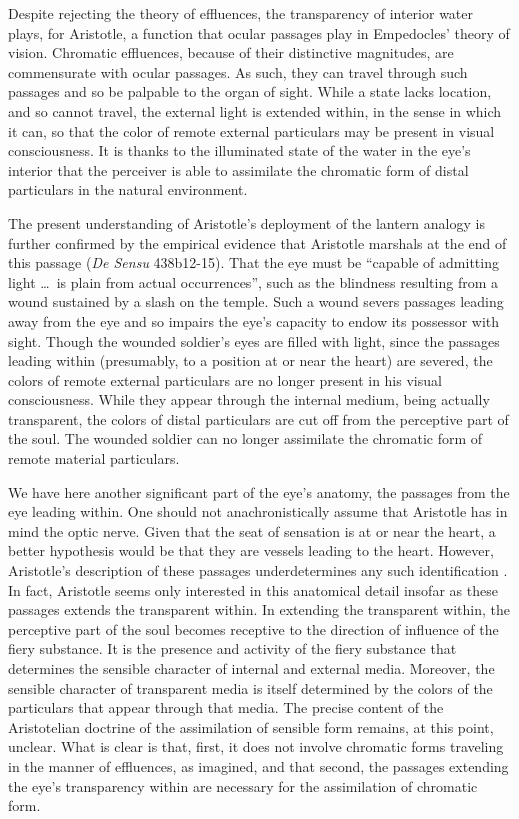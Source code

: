 Despite rejecting the theory of effluences, the transparency of interior water plays, for Aristotle, a function that ocular passages play in Empedocles' theory of vision. Chromatic effluences, because of their distinctive magnitudes, are commensurate with ocular passages. As such, they can travel through such passages and so be palpable to the organ of sight. While a state lacks location, and so cannot travel, the external light is extended within, in the sense in which it can, so that the color of remote external particulars may be present in visual consciousness. It is thanks to the illuminated state of the water in the eye's interior that the perceiver is able to assimilate the chromatic form of distal particulars in the natural environment.

The present understanding of Aristotle's deployment of the lantern analogy is further confirmed by the empirical evidence that Aristotle marshals at the end of this passage (\emph{De Sensu} 438b12-15). That the eye must be ``capable of admitting light \ldots\ is plain from actual occurrences'', such as the blindness resulting from a wound sustained by a slash on the temple. Such a wound severs passages leading away from the eye and so impairs the eye's capacity to endow its possessor with sight. Though the wounded soldier's eyes are filled with light, since the passages leading within (presumably, to a position at or near the heart) are severed, the colors of remote external particulars are no longer present in his visual consciousness. While they appear through the internal medium, being actually transparent, the colors of distal particulars are cut off from the perceptive part of the soul. The wounded soldier can no longer assimilate the chromatic form of remote material particulars.

We have here another significant part of the eye's anatomy, the passages from the eye leading within. One should not anachronistically assume that Aristotle has in mind the optic nerve. Given that the seat of sensation is at or near the heart, a better hypothesis would be that they are vessels leading to the heart. However, Aristotle's description of these passages underdetermines any such identification \citep[see][]{Lloyd:1978fk}. In fact, Aristotle seems only interested in this anatomical detail insofar as these passages extends the transparent within. In extending the transparent within, the perceptive part of the soul becomes receptive to the direction of influence of the fiery substance. It is the presence and activity of the fiery substance that determines the sensible character of internal and external media. Moreover, the sensible character of transparent media is itself determined by the colors of the particulars that appear through that media. The precise content of the Aristotelian doctrine of the assimilation of sensible form remains, at this point, unclear. What is clear is that, first, it does not involve chromatic forms traveling in the manner of effluences, as \citet[\textsc{i} 1]{Hobbes} imagined, and that second, the passages extending the eye's transparency within are necessary for the assimilation of chromatic form. 

